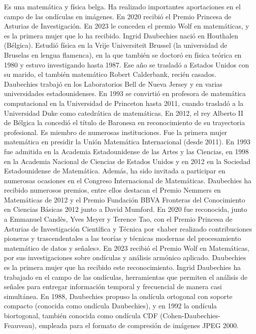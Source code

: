 




\begin{parchment} {Es una matemática y física belga. Ha realizado importantes aportaciones en el campo de las ondículas en imágenes. En 2020 recibió el Premio Princesa de Asturias de Investigación. En 2023 le conceden el premio Wolf en matemáticas, y es la primera mujer que lo ha recibido.
Ingrid Daubechies nació en Houthalen (Bélgica). Estudió física en la Vrije Universiteit Brussel (la universidad de Bruselas en lengua flamenca), en la que también se doctoró en física teórica en 1980 y estuvo investigando hasta 1987. Ese año se trasladó a Estados Unidos con su marido, el también matemático Robert Calderbank, recién casados. Daubechies trabajó en los Laboratorios Bell de Nueva Jersey y en varias universidades estadounidenses. En 1993 se convirtió en profesora de matemática computacional en la Universidad de Princeton hasta 2011, cuando trasladó a la Universidad Duke como catedrática de matemáticas.
En 2012, el rey Alberto II de Bélgica la concedió el título de Baronesa en reconocimiento de su trayectoria profesional.
Es miembro de numerosas instituciones. Fue la primera mujer matemática en presidir la Unión Matemática Internacional (desde 2011). En 1993 fue admitida en la Academia Estadounidense de las Artes y las Ciencias, en 1998 en la Academia Nacional de Ciencias de Estados Unidos y en 2012 en la Sociedad Estadounidense de Matemática. Además, ha sido invitada a participar en numerosas ocasiones en el Congreso Internacional de Matemáticas.
Daubechies ha recibido numerosos premios, entre ellos destacan el Premio Nemmers en Matemáticas de 2012 y el Premio Fundación BBVA Fronteras del Conocimiento en Ciencias Básicas 2012 junto a David Mumford.
En 2020 fue reconocida, junto a Emmanuel Candès, Yves Meyer y Terence Tao, con el Premio Princesa de Asturias de Investigación Científica y Técnica por «haber realizado contribuciones pioneras y trascendentales a las teorías y técnicas modernas del procesamiento matemático de datos y señales».
En 2023 recibió el Premio Wolf en Matemáticas, por sus investigaciones sobre ondículas y análisis armónico aplicado. Daubechies es la primera mujer que ha recibido este reconocimiento.
Ingrid Daubechies ha trabajado en el campo de las ondículas, herramientas que permiten el análisis de señales para entregar información temporal y frecuencial de manera casi simultánea. En 1988, Daubechies propuso la ondícula ortogonal con soporte compacto (conocida como ondícula Daubechies), y en 1992 la ondícula biortogonal, también conocida como ondícula CDF (Cohen-Daubechies-Feauveau), empleada para el formato de compresión de imágenes JPEG 2000.
}
\end{parchment}
